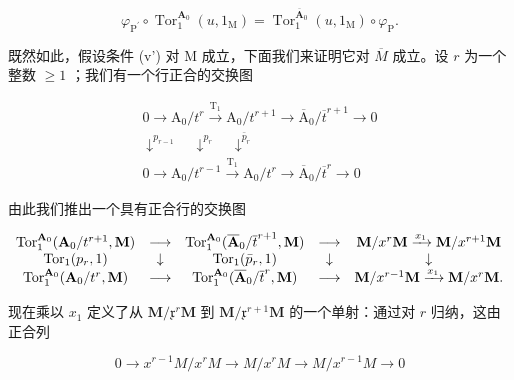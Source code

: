 \[
\varphi_ {\mathrm{P} ^ {\prime}} \circ \operatorname{Tor} _ {1} ^ {\mathbf {A} _ {0}} (u, 1 _ {\mathrm{M}}) = \operatorname{Tor} _ {1} ^ {\overline {{\mathbf {A}}} _ {0}} (u, 1 _ {\mathrm{M}}) \circ \varphi_ {\mathrm{P}}.
\]

既然如此，假设条件 (v') 对 M 成立，下面我们来证明它对 \(\overline{M}\) 成立。设 \(r\) 为一个整数 \(\geqslant 1\) ；我们有一个行正合的交换图

\[
\begin{array}{c} 0 \longrightarrow \mathrm{A} _ {0} / t ^ {r} \xrightarrow {\mathrm{T} _ {1}} \mathrm{A} _ {0} / t ^ {r + 1} \longrightarrow \overline {{\mathrm{A}}} _ {0} / \overline {{t}} ^ {r + 1} \longrightarrow 0 \\ \downarrow^ {p _ {r - 1}} \quad \downarrow^ {p _ {r}} \quad \downarrow^ {\bar {p} _ {r}} \\ 0 \longrightarrow \mathrm{A} _ {0} / t ^ {r - 1} \xrightarrow {\mathrm{T} _ {1}} \mathrm{A} _ {0} / t ^ {r} \longrightarrow \overline {{\mathrm{A}}} _ {0} / \overline {{t}} ^ {r} \longrightarrow 0 \end{array}
\]

由此我们推出一个具有正合行的交换图

\[
\begin{array}{c c c c c} \operatorname{Tor} _ {1} ^ {\mathbf {A} _ {0}} (\mathbf {A} _ {0} / t ^ {r + 1}, \mathbf {M}) & \longrightarrow & \operatorname{Tor} _ {1} ^ {\mathbf {A} _ {0}} (\overline {{\mathbf {A}}} _ {0} / \overline {{t}} ^ {r + 1}, \mathbf {M}) & \longrightarrow & \mathbf {M} / x ^ {r}   \mathbf {M} \xrightarrow {x _ {1}} \mathbf {M} / x ^ {r + 1}   \mathbf {M} \\ \operatorname{Tor} _ {1} (p _ {r}, 1) & \downarrow & \operatorname{Tor} _ {1} (\bar {p} _ {r}, 1) & \downarrow & \downarrow \\ \operatorname{Tor} _ {1} ^ {\mathbf {A} _ {0}} (\mathbf {A} _ {0} / t ^ {r}, \mathbf {M}) & \longrightarrow & \operatorname{Tor} _ {1} ^ {\mathbf {A} _ {0}} (\overline {{\mathbf {A}}} _ {0} / \overline {{t}} ^ {r}, \mathbf {M}) & \longrightarrow & \mathbf {M} / x ^ {r - 1}   \mathbf {M} \xrightarrow {x _ {1}} \mathbf {M} / x ^ {r}   \mathbf {M}. \end{array}
\]

现在乘以 \(x_{1}\) 定义了从 \(\mathbf{M}/\mathfrak{x}^{r}\mathbf{M}\) 到 \(\mathbf{M}/\mathfrak{x}^{r+1}\mathbf{M}\) 的一个单射：通过对 \(r\) 归纳，这由正合列

\[
0 \rightarrow x ^ {r - 1} M / x ^ {r} M \rightarrow M / x ^ {r} M \rightarrow M / x ^ {r - 1} M \rightarrow 0
\]

